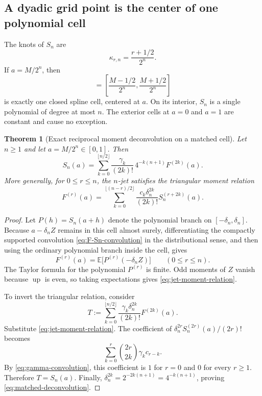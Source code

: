 \documentclass[11pt]{article}
\newtheorem{theorem}{Theorem}[section]
\newcommand{\upf}{\operatorname{up}}
\newcommand{\E}{\mathbb{E}}
\begin{document}
\subsection{A dyadic grid point is the center of one polynomial cell}

The knots of $S_n$ are
\begin{equation}
 \kappa_{r,n}=\frac{r+1/2}{2^n}.
 \label{eq:knots}
\end{equation}
If $a=M/2^n$, then
\begin{equation}
 [a-\delta_n,a+\delta_n]
 =\left[\frac{M-1/2}{2^n},\frac{M+1/2}{2^n}\right]
 \label{eq:matched-cell}
\end{equation}
is exactly one closed spline cell, centered at $a$.  On its interior, $S_n$
is a single polynomial of degree at most $n$.  The exterior cells at $a=0$
and $a=1$ are constant and cause no exception.

\begin{theorem}[Exact reciprocal moment deconvolution on a matched cell]
\label{thm:matched-deconvolution}
Let $n\ge1$ and let $a=M/2^n\in[0,1]$.  Then
\begin{equation}
 \boxed{
 S_n(a)=\sum_{k=0}^{\lfloor n/2\rfloor}
 \frac{\gamma_k}{(2k)!}\,4^{-k(n+1)}F^{(2k)}(a).}
 \label{eq:matched-deconvolution}
\end{equation}
More generally, for $0\le r\le n$, the $n$-jet satisfies the triangular
moment relation
\begin{equation}
 F^{(r)}(a)=
 \sum_{k=0}^{\lfloor(n-r)/2\rfloor}
 \frac{c_k\delta_n^{2k}}{(2k)!}
 S_n^{(r+2k)}(a).
 \label{eq:jet-moment-relation}
\end{equation}
\end{theorem}

\begin{proof}
Let $P(h)=S_n(a+h)$ denote the polynomial branch on
$[-\delta_n,\delta_n]$.  Because $a-\delta_n Z$ remains in this cell almost
surely, differentiating the compactly supported convolution
\eqref{eq:F-Sn-convolution} in the distributional sense, and then using the
ordinary polynomial branch inside the cell, gives
\begin{equation}
 F^{(r)}(a)=\E\bigl[P^{(r)}(-\delta_n Z)\bigr]
 \qquad(0\le r\le n).
 \label{eq:derivative-expectation}
\end{equation}
The Taylor formula for the polynomial $P^{(r)}$ is finite.  Odd moments of $Z$
vanish because $\upf$ is even, so taking expectations gives
\eqref{eq:jet-moment-relation}.

To invert the triangular relation, consider
\begin{equation}
 T:=\sum_{k=0}^{\lfloor n/2\rfloor}
 \frac{\gamma_k\delta_n^{2k}}{(2k)!}F^{(2k)}(a).
\end{equation}
Substitute \eqref{eq:jet-moment-relation}.  The coefficient of
$\delta_n^{2r}S_n^{(2r)}(a)/(2r)!$ becomes
\begin{equation}
 \sum_{k=0}^{r}\binom{2r}{2k}\gamma_kc_{r-k}.
\end{equation}
By \eqref{eq:gamma-convolution}, this coefficient is $1$ for $r=0$ and $0$
for every $r\ge1$.  Therefore $T=S_n(a)$.  Finally,
$\delta_n^{2k}=2^{-2k(n+1)}=4^{-k(n+1)}$, proving
\eqref{eq:matched-deconvolution}.
\end{proof}
\end{document}
